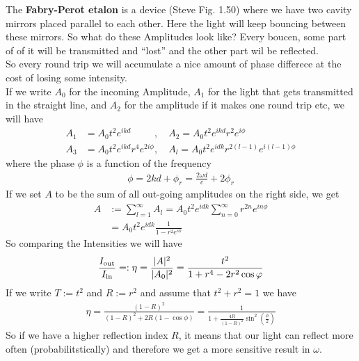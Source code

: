The \textbf{Fabry-Perot etalon} is a device (Steve Fig. 1.50) where we have two cavity mirrors placed parallel to each other. Here the light will keep bouncing between these mirrors. So what do these Amplitudes look like? Every boucen, some part of of it will be transmitted and ``lost'' and the other part wil be reflected.\\

So every round trip we will accumulate a nice amount of phase differece at the cost of losing some intensity.\\
If we write $A_0$ for the incoming Amplitude, $A_1$ for the light that gets transmitted in the straight line, and $A_2$ for the amplitude if it makes one round trip etc, we will have
\begin{align*}
  A_1 &= A_0 t^2 e^{ikd}\phantom{r^2e^{2i\phi}}, \quad A_2 = A_0t^2 e^{ikd}r^2 e^{i \phi}\\
  A_3 &= A_0t^2 e^{ikd}r^4 e^{2i\phi}, \quad A_l = A_0 t^{2} e^{idk}r^{2(l-1)}e^{i(l-1)\phi}
\end{align*}
where the phase $\phi$ is a function of the frequency
\begin{align*}
\phi = 2kd + \phi_r = \frac{2 \omega d}{c} + 2\phi_r
\end{align*}
If we set $A$ to be the sum of all out-going amplitudes on the right side, we get
\begin{align*}
  A & := \sum_{l = 1}^{\infty}A_l = A_0 t^2 e^{idk} \sum_{n=0}^{\infty} r^{2n} e^{in\phi}\\
		&= A_0 t^{2} e^{idk} \frac{1}{1 - r^2e^{i\phi}}
\end{align*}
So comparing the Intensities we will have
\begin{align*}
	\frac{I_{\text{out}}}{I_{\text{in}}} =: \eta = \frac{\vert A\vert^2}{\vert A_0\vert^2} = \frac{t^2}{1 + r^4 - 2r^2 \cos\varphi}
\end{align*}
If we write $T:= t^2$ and $R:= r^2$ and assume that $t^2 + r^2 =1$ we have
\begin{align*}
	\eta = \frac{(1 - R)^2}{(1-R)^2 + 2R(1 - \cos\phi)}	= \frac{1}{1 + \frac{4R}{(1-R)^2} \sin^2 \left(\frac{\phi}{2}\right)}
\end{align*}
So if we have a higher reflection index $R$, it means that our light can reflect more often (probabilitstically) and therefore we get a more sensitive result in $\omega$.
